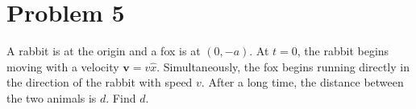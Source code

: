 \documentclass[11pt]{scrartcl}
\begin{document}
\section{Problem 5}
A rabbit is at the origin and a fox is at $(0, -a)$.
At $t=0$, the rabbit begins moving with a velocity $\bm{v} = v \hat{x}$.
Simultaneously, the fox begins running directly in the direction of the rabbit with speed $v$.
After a long time, the distance between the two animals is $d$.
Find $d$.
\end{document}
